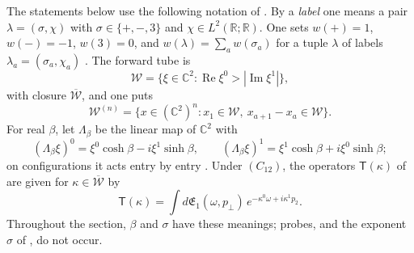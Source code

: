 \documentclass[11pt,letterpaper,reqno]{amsart}
\theoremstyle{definition}
\begin{document}
The statements below use the following notation of \cite{QEDII}.
By a \emph{label} one means a pair $\lambda=(\sigma,\chi)$ with $\sigma\in\{+,-,3\}$ and $\chi\in L^2(\mathbb R;\mathbb R)$.
One sets $w(+)=1$, $w(-)=-1$, $w(3)=0$, and $w(\lambda)=\sum_aw(\sigma_a)$ for a tuple $\lambda$ of labels $\lambda_a=(\sigma_a,\chi_a)$ \cite[Definition~14.5]{QEDII}.
The forward tube is
\begin{equation*}
\mathcal W=\{\xi\in\mathbb C^2:\operatorname{Re}\xi^0>|\operatorname{Im}\xi^1|\},
\end{equation*}
with closure $\overline{\mathcal W}$, and one puts
\begin{equation*}
\mathcal W^{(n)}=\{x\in(\mathbb C^2)^n:x_1\in\mathcal W,\ x_{a+1}-x_a\in\mathcal W\}.
\end{equation*}
For real $\beta$, let $\Lambda_\beta$ be the linear map of $\mathbb C^2$ with
\begin{equation*}
(\Lambda_\beta\xi)^0=\xi^0\cosh\beta-i\xi^1\sinh\beta,\qquad(\Lambda_\beta\xi)^1=\xi^1\cosh\beta+i\xi^0\sinh\beta;
\end{equation*}
on configurations it acts entry by entry \cite[Lemma~14.9\,(c)]{QEDII}.
Under $(C_{12})$, the operators $\mathsf T(\kappa)$ of \cite[Lemma~14.17]{QEDII} are given for $\kappa\in\overline{\mathcal W}$ by
\begin{equation*}
\mathsf T(\kappa)=\int d\mathfrak E_1(\omega,p_\perp)\,e^{-\kappa^0\omega+i\kappa^1p_2}.
\end{equation*}
Throughout the section, $\beta$ and $\sigma$ have these meanings; probes, and the exponent $\sigma$ of \cite{QEDIII}, do not occur.
\end{document}
